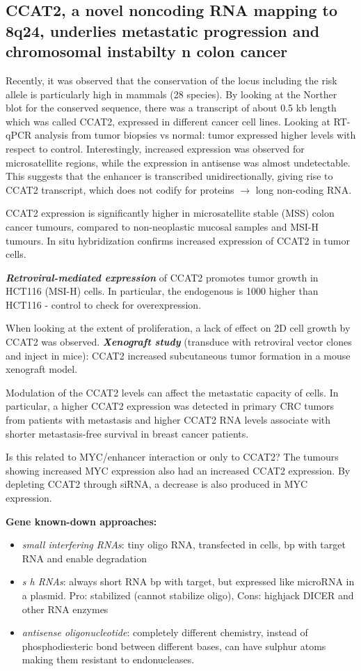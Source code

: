 \subsection{CCAT2, a novel noncoding RNA mapping to 8q24, underlies metastatic progression and chromosomal instabilty n colon cancer}

Recently, it was observed that the conservation of the locus including the risk allele is particularly high in mammals (28 species). By looking at the Norther blot for the conserved sequence, there was a transcript of about 0.5 kb length which was called CCAT2, expressed in different cancer cell lines. Looking at RT-qPCR analysis from tumor biopsies vs normal: tumor expressed higher levels with respect to control. Interestingly, increased expression was observed for microsatellite regions, while the expression in antisense was almost undetectable. This suggests that the enhancer is transcribed unidirectionally, giving rise to CCAT2 transcript, which does not codify for proteins $\rightarrow$ long non-coding RNA.

CCAT2 expression is significantly higher in microsatellite stable (MSS) colon cancer tumours, compared to non-neoplastic mucosal samples and MSI-H tumours. In situ hybridization confirms increased expression of CCAT2 in tumor cells.

\textbf{\emph{Retroviral-mediated expression}} of CCAT2 promotes tumor growth in HCT116 (MSI-H) cells. In particular, the endogenous is 1000 higher than HCT116 - control to check for overexpression.

When looking at the extent of proliferation, a lack of effect on 2D cell growth by CCAT2 was observed. \textbf{\emph{Xenograft study}} (transduce with retroviral vector clones and inject in mice): CCAT2 increased subcutaneous tumor formation in a mouse xenograft model.

Modulation of the CCAT2 levels can affect the metastatic capacity of cells. In particular, a higher CCAT2 expression was detected in primary CRC tumors from patients with metastasis and higher CCAT2 RNA levels associate with shorter metastasis-free survival in breast cancer patients.

Is this related to MYC/enhancer interaction or only to CCAT2? The tumours showing increased MYC expression also had an increased CCAT2 expression. By depleting CCAT2 through siRNA, a decrease is also produced in MYC expression.

\textbf{Gene known-down approaches:}

\begin{itemize}
\tightlist
\item
  \emph{small interfering RNAs}: tiny oligo RNA, transfected in cells, bp with target RNA and enable degradation
\item
  \emph{s h RNAs}: always short RNA bp with target, but expressed like microRNA in a plasmid. Pro: stabilized (cannot stabilize oligo), Cons: highjack DICER and other RNA enzymes
\item
  \emph{antisense oligonucleotide}: completely different chemistry, instead of phosphodiesteric bond between different bases, can have sulphur atoms making them resistant to endonucleases.
\end{itemize}

